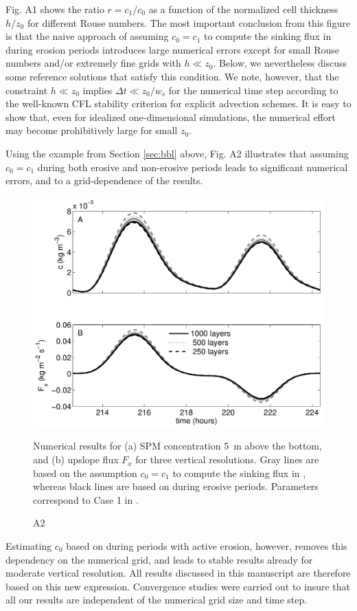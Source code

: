 Fig. A1 shows the ratio $r=c_1/c_0$ as a function of the normalized
cell thickness $h/z_0$ for different Rouse numbers. The most important
conclusion from this figure is that the naive approach of assuming
$c_0 = c_1$ to compute the sinking flux in  during erosion
periods introduces large numerical errors except for small Rouse
numbers and/or extremely fine grids with $h \ll z_0$. Below, we
nevertheless discuss some reference solutions that satisfy this
condition. We note, however, that the constraint $h \ll z_0$ implies
$\Delta t \ll z_0 / w_s$ for the numerical time step according to the
well-known CFL stability criterion for explicit advection schemes. It
is easy to show that, even for idealized one-dimensional simulations,
the numerical effort may become prohibitively large for small $z_0$.

Using the example from Section \ref{sec:bbl} above, Fig. A2
illustrates that assuming $c_0 = c_1$ during both erosive and
non-erosive periods leads to significant numerical errors, and to a
grid-dependence of the results. 
\begin{figure}[ht]
  \noindent\includegraphics[width=29pc,angle=0]{bilder/appendix.pdf}\\ \caption{A2}{Numerical
    results for (a) SPM concentration 5~m above the bottom, and (b)
    upslope flux $F_x$ for three vertical resolutions. Gray lines are
    based on the assumption $c_0 = c_1$ to compute the sinking flux in
    , whereas black lines are based on  during erosive
    periods. Parameters correspond to Case 1 in
    . \label{convergence}}
\end{figure}
Estimating $c_0$ based on 
during periods with active erosion, however, removes this dependency
on the numerical grid, and leads to stable results already for
moderate vertical resolution. All results discussed in this manuscript
are therefore based on this new expression. Convergence studies were
carried out to insure that all our results are independent of the
numerical grid size and time step.